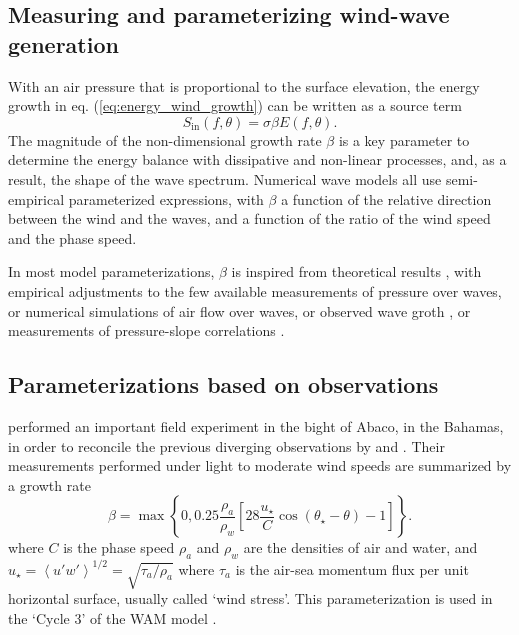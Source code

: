 

\subsection{Measuring and parameterizing wind-wave generation}
With an air pressure that is proportional to the surface elevation, the 
 energy growth in eq. (\ref{eq:energy_wind_growth}) can be written as a source term  
\begin{equation}
    S_{\mathrm{in}}\left(f,\theta\right)=\sigma \beta E\left(f,\theta\right).
\end{equation}
The magnitude of the non-dimensional growth rate $\beta$ is a key parameter 
to determine the energy balance with dissipative and non-linear processes, and, as a result, the shape of the wave spectrum. 
Numerical wave models all use semi-empirical parameterized expressions, with  $\beta$ a function of the relative direction between the wind and the waves, and a function
of the ratio of the wind speed and the phase speed. 

In most model parameterizations,   $\beta$ is inspired from theoretical results \citep[e.g.][]{Miles1959,Fabrikant1976,Miles1996b}, 
with empirical adjustments to the few 	available measurements of pressure over waves, or numerical simulations of air flow over waves, 
or observed wave groth \citep{Plant1982}, or measurements of pressure-slope correlations \citep{Snyder&al.1981,Donelan&al.2005b,Donelan&al.2006}.

\subsection{Parameterizations based on observations}
\cite{Snyder&al.1981} performed an important field experiment in the bight of Abaco, in the Bahamas, in order to 
reconcile the previous diverging observations by \cite{Dobson1971} and \cite{Snyder&Cox1966}. Their measurements performed under light to moderate 
wind speeds are summarized by a growth rate
\begin{equation}
    \beta=\max\left\{0,0.25 \frac{\rho_a}{\rho_w}\left[28\frac{u_\star}{C}
    \cos\left(\theta_\star - \theta\right)-1\right]\right\}.\label{Snyder}
\end{equation}
where $C$ is the phase speed $\rho_a$ and $\rho_w$ are the densities of air and water, and $u_\star=\left<u'w'\right>^{1/2}=\sqrt{\tau_a / \rho_a}$ where $\tau_a$ is the 
air-sea momentum flux per unit horizontal surface, usually called `wind stress'. 
This parameterization is used in the `Cycle 3' of the WAM model \citep{WAMDI1988}. 

